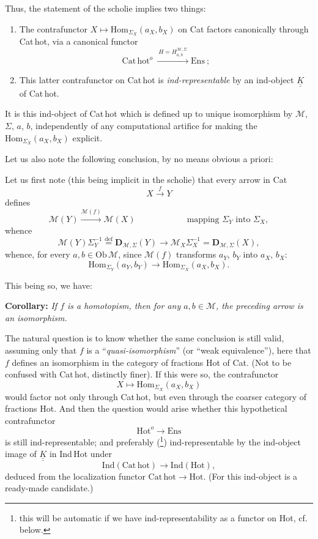 \documentclass[11pt]{article}
\newcommand{\printedpage}[1]{\marginpar{\footnotesize p.~#1}}
\newcommand{\msp}[1]{\marginpar{\footnotesize [#1]}}
\newcommand{\cM}{\mathcal{M}}
\newcommand{\KK}{\underline{\underline{K}}}
\newcommand{\dfeq}{\overset{\text{def}}{=}}
\newcommand{\Cathot}{\mathrm{Cat\,hot}}
\begin{document}
Thus, the statement of the scholie implies two things:

\begin{enumerate}
\item[a)] The contrafunctor $X\longmapsto\mathrm{Hom}_{\Sigma_X}(a_X,b_X)$ on Cat factors canonically through Cat\,hot, via a canonical functor
\[
\Cathot^{o}\ \xrightarrow{\ H=H^{\cM,\Sigma}_{a,b}\ }\mathrm{Ens}\ ;
\]
\item[b)] This latter contrafunctor on Cat\,hot is \textit{ind-representable} by an ind-object $\KK$ of Cat\,hot.
\end{enumerate}

It is this ind-object of Cat\,hot which is defined up to unique isomorphism by $\cM$, $\Sigma$, $a$, $b$, independently of any computational artifice for making the $\mathrm{Hom}_{\Sigma_X}(a_X,b_X)$ explicit.

Let us also note the following conclusion, by no means obvious a priori:

\msp{page 35}
Let us first note (this being implicit in the scholie) that every arrow in Cat
\[
X\xrightarrow{\ f\ }Y
\]
defines
\[
\cM(Y)\xrightarrow{\cM(f)}\cM(X) \qquad\qquad\qquad \text{mapping } \Sigma_Y \text{ into } \Sigma_X,
\]
whence
\[
\cM(Y)\Sigma_Y^{-1}\dfeq\mathbf{D}_{\cM,\Sigma}(Y)\longrightarrow\cM_X\Sigma_X^{-1}=\mathbf{D}_{\cM,\Sigma}(X),
\]
 whence, for every $a,b\in\mathrm{Ob}\,\cM$, since $\cM(f)$ transforms $a_Y$, $b_Y$ into $a_X$, $b_X$:
\[
\boxed{\mathrm{Hom}_{\Sigma_Y}(a_Y,b_Y)\longrightarrow\mathrm{Hom}_{\Sigma_X}(a_X,b_X).}
\]

This being so, we have:

\textbf{Corollary:} \textit{If $f$ is a homotopism, then for any $a,b\in\cM$, the preceding arrow is an isomorphism.} %

The natural question is to know whether the same conclusion is still valid, assuming only that $f$ is a ``\textit{quasi-isomorphism}'' (or ``weak equivalence''), here that $f$ defines an isomorphism in the category of fractions Hot of Cat. (Not to be confused with Cat\,hot,
\printedpage{22}
\msp{page 36}
distinctly finer). If this were so, the contrafunctor
\[
X\longmapsto\mathrm{Hom}_{\Sigma_X}(a_X,b_X)
\]
would factor not only through Cat\,hot, but even through the coarser category of fractions Hot. And then the question would arise whether this hypothetical contrafunctor
\[
\mathrm{Hot}^{o}\longrightarrow\mathrm{Ens}
\]
is still ind-representable; and preferably (\footnote[5]{this will be automatic if we have ind-representability as a functor on Hot, cf. below.}) ind-representable by the ind-object image of $\KK$ in Ind\,Hot under
\[
\mathrm{Ind}(\Cathot)\longrightarrow\mathrm{Ind}(\mathrm{Hot}),
\]
deduced from the localization functor $\Cathot\longrightarrow\mathrm{Hot}$. (For this ind-object is a ready-made candidate.)
\end{document}
